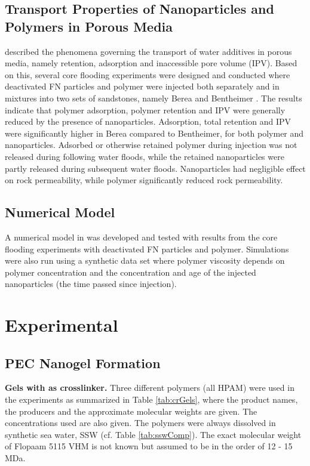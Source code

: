 \documentclass[journal = enfuem, manuscript =  article]{achemso}
\begin{document}
\subsection{Transport Properties of Nanoparticles and Polymers in Porous Media}
\citet{Lotsch1985} described the phenomena governing the transport of water additives in porous media, namely retention, adsorption and inaccessible pore volume (IPV). Based on this, several core flooding experiments were designed and conducted where deactivated FN particles and polymer were injected both separately and in mixtures into two sets of sandstones, namely Berea and Bentheimer \citep{Najafiazar2016}. The results indicate that polymer adsorption, polymer retention and IPV were generally reduced by the presence of nanoparticles. Adsorption, total retention and IPV were significantly higher in Berea compared to Bentheimer, for both polymer and nanoparticles. Adsorbed or otherwise retained polymer during injection was not released during following water floods, while the retained nanoparticles were partly released during subsequent water floods. Nanoparticles had negligible effect on rock permeability, while polymer significantly reduced rock permeability.

\subsection{Numerical Model}
A numerical model in was developed and tested with results from the core flooding experiments with deactivated FN particles and polymer. Simulations were also run using a synthetic data set where polymer viscosity depends on polymer concentration and the concentration and age of the injected nanoparticles (the time passed since injection).

\section{Experimental}
\subsection{PEC Nanogel Formation}
\textbf{Gels with  as crosslinker.}
Three different polymers (all HPAM) were used in the experiments as summarized in Table \ref{tab:crGels}, where the product names, the producers and the approximate molecular weights are given. The concentrations used are also given. The polymers were always dissolved in synthetic sea water, SSW (cf. Table \ref{tab:sswComp}). The exact molecular weight of Flopaam 5115 VHM is not known but assumed to be in the order of 12 - 15 MDa.
\end{document}
